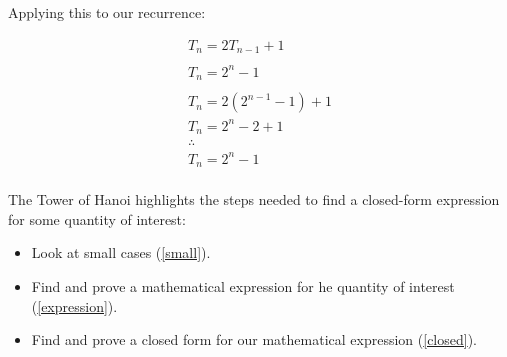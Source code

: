 \documentclass[12pt letter]{report}
\begin{document}
Applying this to our recurrence:

\begin{align*}
	T_n = 2T_{n-1} + 1       \\
	\\
	T_n = 2^{n} - 1          \\
	\\
	T_n = 2(2^{n-1} -1 ) + 1 \\
	T_n = 2^{n} -2 + 1       \\
	\therefore               \\
	T_n = 2^n -1             \\
\end{align*}

The Tower of Hanoi highlights the steps needed to find a closed-form expression for some quantity of interest:

\begin{itemize}
	\item Look at small cases (\ref{small}).
	\item Find and prove a mathematical expression for he quantity of interest (\ref{expression}).
	\item Find and prove a closed form for our mathematical expression (\ref{closed}).
\end{itemize}
\end{document}
